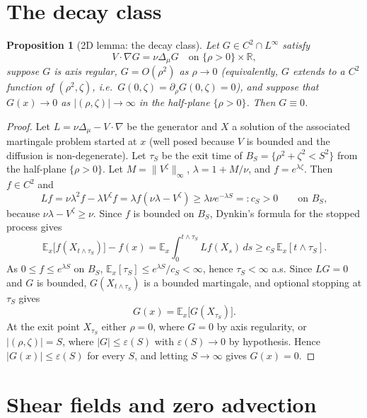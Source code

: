 \documentclass[11pt]{article}
\newtheorem{proposition}[theorem]{Proposition}
\theoremstyle{definition}
\newcommand{\R}{\mathbb{R}}
\begin{document}
\section{The decay class}
\begin{proposition}[2D lemma: the decay class]\label{prop:2d}
Let $G\in C^2\cap L^\infty$ satisfy
\begin{equation}\label{eq:2d}
V\cdot\nabla G=\nu\Delta_\mu G\quad\text{on }\{\rho>0\}\times\R,
\end{equation}
suppose $G$ is axis regular, $G=O(\rho^2)$ as $\rho\to0$ (equivalently, $G$
extends to a $C^2$ function of $(\rho^2,\zeta)$, i.e.\
$G(0,\zeta)=\partial_\rho G(0,\zeta)=0$), and suppose that
$G(x)\to0$ as $|(\rho,\zeta)|\to\infty$ in the half-plane
$\{\rho>0\}$. Then $G\equiv0$.
\end{proposition}
\begin{proof}
Let $L=\nu\Delta_\mu-V\cdot\nabla$ be the generator and $X$ a solution of the
associated martingale problem started at $x$ (well posed because $V$ is bounded
and the diffusion is non-degenerate). Let $\tau_S$ be the exit time of
$B_S=\{\rho^2+\zeta^2<S^2\}$ from the half-plane $\{\rho>0\}$. Let
$M=\|V^\zeta\|_\infty$, $\lambda=1+M/\nu$, and $f=e^{\lambda\zeta}$. Then
$f\in C^2$ and
\begin{equation}
Lf=\nu\lambda^2f-\lambda V^\zeta f
=\lambda f(\nu\lambda-V^\zeta)
\ge\lambda\nu e^{-\lambda S}=:c_S>0
\qquad\text{on }B_S ,
\end{equation}
because $\nu\lambda-V^\zeta\ge\nu$. Since $f$ is bounded on $B_S$, Dynkin's
formula for the stopped process gives
\begin{equation}
\mathbb E_x\bigl[f(X_{t\wedge\tau_S})\bigr]-f(x)
=\mathbb E_x\int_0^{t\wedge\tau_S}Lf(X_s)\,ds
\ge c_S\,\mathbb E_x[t\wedge\tau_S].
\end{equation}
As $0\le f\le e^{\lambda S}$ on $B_S$,
$\mathbb E_x[\tau_S]\le e^{\lambda S}/c_S<\infty$, hence $\tau_S<\infty$
a.s. Since $LG=0$ and $G$ is bounded, $G(X_{t\wedge\tau_S})$ is
a bounded martingale, and optional stopping at $\tau_S$ gives
\begin{equation}
G(x)=\mathbb E_x\bigl[G(X_{\tau_S})\bigr].
\end{equation}
At the exit point $X_{\tau_S}$ either $\rho=0$, where $G=0$ by axis regularity,
or $|(\rho,\zeta)|=S$, where $|G|\le\varepsilon(S)$ with $\varepsilon(S)\to0$
by hypothesis. Hence $|G(x)|\le\varepsilon(S)$ for every $S$, and letting
$S\to\infty$ gives $G(x)=0$.
\end{proof}
\section{Shear fields and zero advection}
\end{document}
